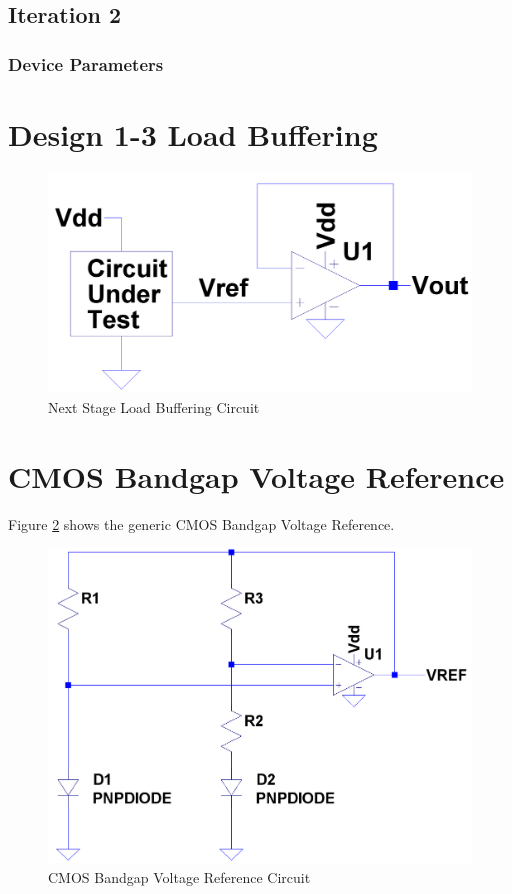 \documentclass[conference]{IEEEtran}
\begin{document}
\subsection{Iteration 2}
	\subsubsection{Device Parameters}


\section{Design 1-3 Load Buffering}
	\label{sec:Buff}

\begin{figure}[!htbp]
  	\centering
  	\includegraphics[scale=0.15]{images/loadbuff.png}
  	\caption[loadbuff]{Next Stage Load Buffering Circuit}
  	\label{fig:loadbuff}
	\end{figure}

\section{CMOS Bandgap Voltage Reference}
Figure \ref{fig:bgr-1} shows the generic CMOS Bandgap Voltage Reference. 

\begin{figure}[!htbp]
  	\centering
  	\includegraphics[scale=0.25]{images/bgr-1.png}
  	\caption[bgr-1]{CMOS Bandgap Voltage Reference Circuit}
  	\label{fig:bgr-1}
	\end{figure}
\end{document}
